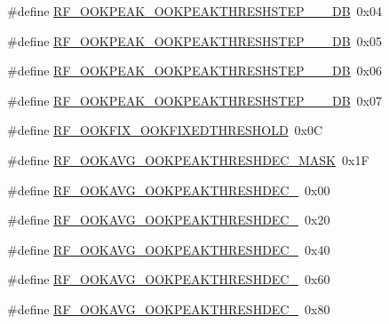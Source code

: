 \begin{DoxyCompactItemize}
\item 
\#define \mbox{\hyperlink{sx1276_regs-_fsk_8h_a38a4fc95f2ee8beda4d0e385613f1bfb}{R\+F\+\_\+\+O\+O\+K\+P\+E\+A\+K\+\_\+\+O\+O\+K\+P\+E\+A\+K\+T\+H\+R\+E\+S\+H\+S\+T\+E\+P\+\_\+\_\+\_\+\+DB}}~0x04
\item 
\#define \mbox{\hyperlink{sx1276_regs-_fsk_8h_aec641cef999dd2d468a584ea612e2c03}{R\+F\+\_\+\+O\+O\+K\+P\+E\+A\+K\+\_\+\+O\+O\+K\+P\+E\+A\+K\+T\+H\+R\+E\+S\+H\+S\+T\+E\+P\+\_\+\_\+\_\+\+DB}}~0x05
\item 
\#define \mbox{\hyperlink{sx1276_regs-_fsk_8h_ae8518d15001ad5791fbeb05923019dec}{R\+F\+\_\+\+O\+O\+K\+P\+E\+A\+K\+\_\+\+O\+O\+K\+P\+E\+A\+K\+T\+H\+R\+E\+S\+H\+S\+T\+E\+P\+\_\+\_\+\_\+\+DB}}~0x06
\item 
\#define \mbox{\hyperlink{sx1276_regs-_fsk_8h_a085b555fd2c09aa73357dc6336eda7ac}{R\+F\+\_\+\+O\+O\+K\+P\+E\+A\+K\+\_\+\+O\+O\+K\+P\+E\+A\+K\+T\+H\+R\+E\+S\+H\+S\+T\+E\+P\+\_\+\_\+\_\+\+DB}}~0x07
\item 
\#define \mbox{\hyperlink{sx1276_regs-_fsk_8h_ad2bf54f789e69283ca0bf08d696bb721}{R\+F\+\_\+\+O\+O\+K\+F\+I\+X\+\_\+\+O\+O\+K\+F\+I\+X\+E\+D\+T\+H\+R\+E\+S\+H\+O\+LD}}~0x0C
\item 
\#define \mbox{\hyperlink{sx1276_regs-_fsk_8h_a2287adb3befe89936e5ed0572c501aa9}{R\+F\+\_\+\+O\+O\+K\+A\+V\+G\+\_\+\+O\+O\+K\+P\+E\+A\+K\+T\+H\+R\+E\+S\+H\+D\+E\+C\+\_\+\+M\+A\+SK}}~0x1F
\item 
\#define \mbox{\hyperlink{sx1276_regs-_fsk_8h_a6c9b34eb4954c700c6f4ba92809d3ffe}{R\+F\+\_\+\+O\+O\+K\+A\+V\+G\+\_\+\+O\+O\+K\+P\+E\+A\+K\+T\+H\+R\+E\+S\+H\+D\+E\+C\+\_}}~0x00
\item 
\#define \mbox{\hyperlink{sx1276_regs-_fsk_8h_aa67814a74e18aba2675aeb52d1ea7b8b}{R\+F\+\_\+\+O\+O\+K\+A\+V\+G\+\_\+\+O\+O\+K\+P\+E\+A\+K\+T\+H\+R\+E\+S\+H\+D\+E\+C\+\_}}~0x20
\item 
\#define \mbox{\hyperlink{sx1276_regs-_fsk_8h_a30ee5ddf6435cc05ce8552efcb7490bd}{R\+F\+\_\+\+O\+O\+K\+A\+V\+G\+\_\+\+O\+O\+K\+P\+E\+A\+K\+T\+H\+R\+E\+S\+H\+D\+E\+C\+\_}}~0x40
\item 
\#define \mbox{\hyperlink{sx1276_regs-_fsk_8h_aea7df55dec934090e2f1f9b6034cd7e9}{R\+F\+\_\+\+O\+O\+K\+A\+V\+G\+\_\+\+O\+O\+K\+P\+E\+A\+K\+T\+H\+R\+E\+S\+H\+D\+E\+C\+\_}}~0x60
\item 
\#define \mbox{\hyperlink{sx1276_regs-_fsk_8h_ad08d706304928ef15901203945928661}{R\+F\+\_\+\+O\+O\+K\+A\+V\+G\+\_\+\+O\+O\+K\+P\+E\+A\+K\+T\+H\+R\+E\+S\+H\+D\+E\+C\+\_}}~0x80
\item 

\end{DoxyCompactItemize}

